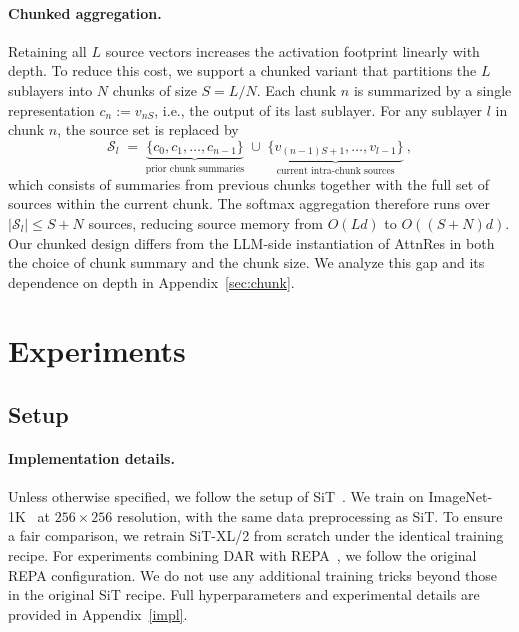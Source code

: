 \documentclass[]{ant_tech_report}
\begin{document}
\paragraph{Chunked aggregation.} Retaining all $L$ source vectors increases the activation footprint linearly with depth. To reduce this cost, we support a chunked variant that partitions the $L$ sublayers into $N$ chunks of size $S = L/N$. Each chunk $n$ is summarized by a single representation $c_n := v_{nS}$, i.e., the output of its last sublayer. For any sublayer $l$ in chunk $n$, the source set is replaced by
\begin{equation}
\mathcal{S}_l \;=\; \underbrace{\{c_0, c_1, \ldots, c_{n-1}\}}_{\text{prior chunk summaries}} \;\cup\; \underbrace{\{v_{(n-1)S+1}, \ldots, v_{l-1}\}}_{\text{current intra-chunk sources}} \ ,
\end{equation}
which consists of summaries from previous chunks together with the full set of sources within the current chunk. The softmax aggregation therefore runs over $|\mathcal{S}_l| \le S + N$ sources, reducing source memory from $O(Ld)$ to $O((S + N)d)$. Our chunked design differs from the LLM-side instantiation of AttnRes in both the choice of chunk summary and the chunk size. We analyze this gap and its dependence on depth in Appendix~\ref{sec:chunk}.


\section{Experiments}   \label{sec:experiment}

\subsection{Setup}

\paragraph{Implementation details.} Unless otherwise specified, we follow the setup of SiT~\citep{ma2024sit}. We train on ImageNet-1K~\citep{russakovsky2015imagenet} at $256 \times 256$ resolution, with the same data preprocessing as SiT. To ensure a fair comparison, we retrain SiT-XL/2 from scratch under the identical training recipe. For experiments combining DAR with REPA~\citep{yu2025repa}, we follow the original REPA configuration. We do not use any additional training tricks beyond those in the original SiT recipe. Full hyperparameters and experimental details are provided in Appendix~\ref{impl}.
\end{document}
